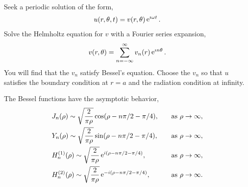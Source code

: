 {%
\begin{Hint}
  Seek a periodic solution of the form,
  \[
  u(r, \theta, t) = v(r, \theta) \mathop{\mathrm{e}}\nolimits^{\imath \omega t}.
  \]
  Solve the Helmholtz equation for $v$ with a Fourier series expansion,
  \[
  v(r, \theta) = \sum_{n = -\infty}^\infty v_n(r) \mathop{\mathrm{e}}\nolimits^{\imath n \theta}.
  \]
  You will find that the $v_n$ satisfy Bessel's equation.  Choose the $v_n$
  so that $u$ satisfies the boundary condition at $r = a$ and the radiation 
  condition at infinity.  

  The Bessel functions have the asymptotic behavior,
  \begin{alignat*}{2}
    &J_n(\rho) \sim \sqrt{ \frac{2}{\pi\rho} } \cos(\rho - n \pi/2 - \pi/4), \quad
    &\mathrm{as}\ \rho \to \infty, \\
    &Y_n(\rho) \sim \sqrt{ \frac{2}{\pi\rho} } \sin(\rho - n \pi/2 - \pi/4), \quad
    &\mathrm{as}\ \rho \to \infty, \\
    &H_n^{(1)}(\rho) \sim \sqrt{ \frac{2}{\pi\rho} } \mathop{\mathrm{e}}\nolimits^{i(\rho - n \pi/2 - \pi/4)}
    ,\quad &\mathrm{as}\ \rho \to \infty, \\
    &H_n^{(2)}(\rho) \sim \sqrt{ \frac{2}{\pi\rho} } \mathop{\mathrm{e}}\nolimits^{-i(\rho- n \pi/2 - \pi/4)}
    ,\quad &\mathrm{as}\ \rho \to \infty.
  \end{alignat*}
\end{Hint}















\begin{Hint}
\end{Hint}







\begin{Hint}
\end{Hint}








\raggedbottom
}
